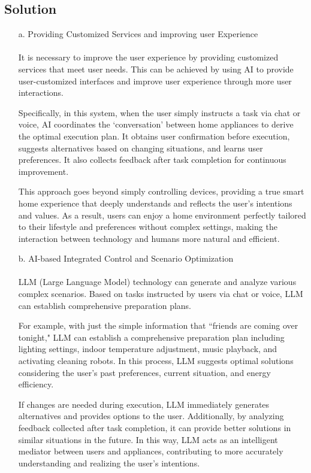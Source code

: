 \documentclass[conference]{IEEEtran}
\begin{document}
\subsection{Solution}
\begin{itemize}
    \item [a.] Providing Customized Services and improving user Experience \\ \\ 
    It is necessary to improve the user experience by providing customized services that meet user needs. This can be achieved by using AI to provide user-customized interfaces and improve user experience through more user interactions.

    \hspace{1em} Specifically, in this system, when the user simply instructs a task via chat or voice, AI coordinates the `conversation' between home appliances to derive the optimal execution plan. It obtains user confirmation before execution, suggests alternatives based on changing situations, and learns user preferences. It also collects feedback after task completion for continuous improvement.
    
    \hspace{1em} This approach goes beyond simply controlling devices, providing a true smart home experience that deeply understands and reflects the user's intentions and values. As a result, users can enjoy a home environment perfectly tailored to their lifestyle and preferences without complex settings, making the interaction between technology and humans more natural and efficient.\\
    
    \item [b.] AI-based Integrated Control and Scenario Optimization \\ \\
    LLM (Large Language Model) technology can generate and analyze various complex scenarios. Based on tasks instructed by users via chat or voice, LLM can establish comprehensive preparation plans.
    
    For example, with just the simple information that ``friends are coming over tonight," LLM can establish a comprehensive preparation plan including lighting settings, indoor temperature adjustment, music playback, and activating cleaning robots. In this process, LLM suggests optimal solutions considering the user's past preferences, current situation, and energy efficiency.
    
    \hspace{1em} If changes are needed during execution, LLM immediately generates alternatives and provides options to the user. Additionally, by analyzing feedback collected after task completion, it can provide better solutions in similar situations in the future. In this way, LLM acts as an intelligent mediator between users and appliances, contributing to more accurately understanding and realizing the user's intentions.\\
    

\end{itemize}
\end{document}
